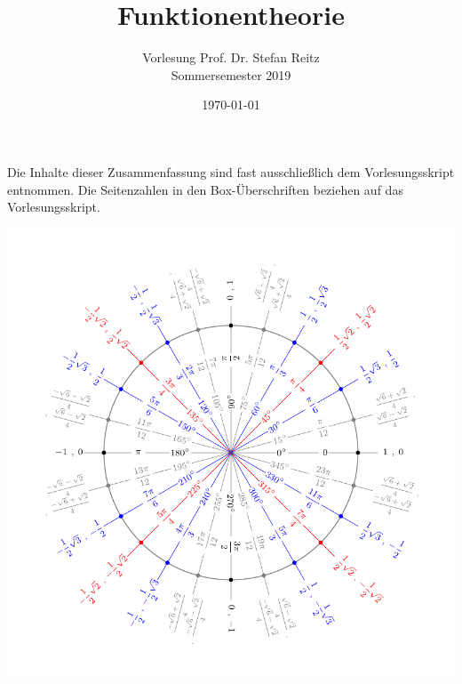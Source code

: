 \documentclass[
	fontsize=7pt,
	a4paper,
	numbers=noenddot,
]{scrartcl}
\title{Funktionentheorie}
\subtitle{Vorlesung Prof. Dr. Stefan Reitz\\Sommersemester 2019}
\author{\autor}
\date{\today}
\numberwithin{equation}{section}
\begin{document}
	\maketitle
	Die Inhalte dieser Zusammenfassung sind fast ausschließlich dem Vorlesungsskript entnommen.
	Die Seitenzahlen in den Box-Überschriften beziehen auf das Vorlesungsskript.\\
	\begin{minipage}{\linewidth}
	  \centering
	  \includegraphics[width=\linewidth]{content/figures/einheitskreis_15}
	\end{minipage}
	\newpage
	\tableofcontents
	\newpage
	
	
	
	
	
	
	
	
	
\end{document}
